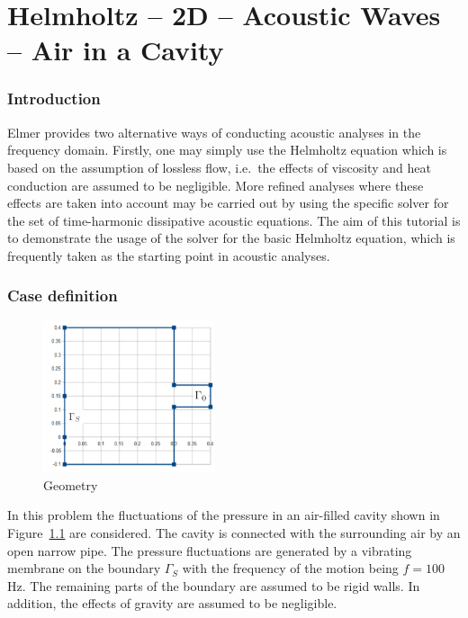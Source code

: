 \chapter{Helmholtz -- 2D -- Acoustic Waves -- Air in a Cavity}



\subsection*{Introduction}

Elmer provides two alternative ways of conducting acoustic analyses in the frequency domain. Firstly, one may simply use the Helmholtz equation which is based on the assumption of lossless flow, i.e.\ the effects of viscosity and heat conduction are assumed to be negligible. More refined analyses where these effects are taken into account may be carried out by using the specific solver for the set of time-harmonic dissipative acoustic equations. The aim of this tutorial is to demonstrate the usage of the solver for the basic Helmholtz equation, which is frequently taken as the starting point in acoustic analyses. 

\subsection*{Case definition}

\begin{figure}
\centering
\includegraphics[width=0.45\textwidth]{geometry}
\caption{Geometry}\label{fg:geometry}
\end{figure}

In this problem the fluctuations of the pressure in an air-filled cavity shown in Figure~\ref{fg:geometry} are considered. The cavity is connected with the surrounding air by an open narrow pipe. The pressure fluctuations are generated by a vibrating membrane on the boundary $\Gamma_S$ with the frequency of the motion being $f=100$ Hz.  The remaining parts of the boundary are assumed to be rigid walls. In addition, the effects of gravity are assumed to be negligible.

